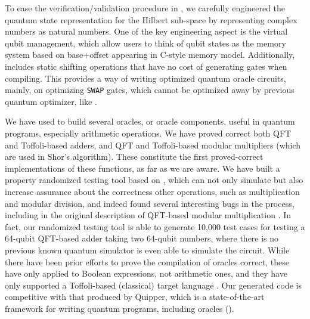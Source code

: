 {To ease the verification/validation procedure in \vqir, we carefully engineered the quantum state representation for the Hilbert sub-space by representing complex numbers as natural numbers.
One of the key engineering aspect is the virtual qubit management,
which allow users to think of qubit states as the memory system based on base+offset appearing in C-style memory model.
Additionally,
\vqir includes static shifting operations that have no cost of generating gates when compiling.
This provides a way of writing optimized quantum oracle circuits, mainly, on optimizing \texttt{SWAP} gates,
which cannot be optimized away by previous quantum optimizer, like \voqc.

We have used \vqir to build several oracles, or oracle components,
useful in quantum programs, especially arithmetic operations.
We have proved correct both QFT and Toffoli-based adders,
and QFT and Toffoli-based modular multipliers (which are used in Shor's
algorithm). These constitute the first proved-correct implementations
of these functions, as far as we are aware. 
We have built a property randomized testing tool based on \vqir,
which can not only simulate but also increase assurance about the correctness other operations,
such as multiplication and modular division, and indeed found several
interesting bugs in the process, including in the original description
of QFT-based modular multiplication \cite{qft-adder}. 
In fact, our randomized testing tool is able to generate 10,000 test cases for testing a 64-qubit QFT-based adder taking two 64-qubit numbers, where there is no previous known quantum simulator is even able to simulate the circuit.
While there
have been prior efforts to prove the compilation of oracles correct,
these have only applied to Boolean expressions, not arithmetic ones,
and they have only supported a Toffoli-based (classical) target
language \cite{reverC,Rand2018ReQWIRERA}. Our generated code is competitive
with that produced by Quipper, which is a state-of-the-art framework
for writing quantum programs, including oracles ().

}
